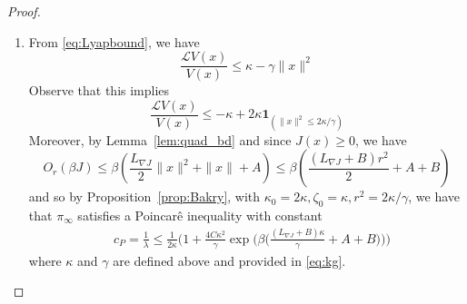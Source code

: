 \documentclass[journal,onecolumn]{IEEEtran}
\newcommand{\grad}{\nabla}
\newcommand{\rew}{J}
\newcommand{\dimn}{N}
\newcommand{\gibbs}{\ids_{\infty}}
\newcommand{\pconst}{c_P}
\newcommand{\bc}{\kappa_0}
\newcommand{\bcc}{\zeta_0}
\newcommand{\bccc}{r}
\newcommand{\gen}{\mathcal{L}}
\newcommand{\ind}{\boldsymbol{1}}
\newcommand{\ids}{\pi}
\newcommand{\idistmax}{\bar{\ids}_0}
\newcommand{\idw}{\gamma}
\newcommand{\isp}{0,\idw}
\newcommand{\idistmaxw}{\bar{\ids}_{\isp}}
\newcommand{\tailbound}{M}
\newcommand{\constA}{A}
\newcommand{\constB}{B}
\newcommand{\idiffc}{I}
\newcommand{\dissm}{m}
\newcommand{\dissb}{b}
\newcommand{\larg}{x}
\newcommand{\lipGJ}{L_{\grad\rew}}
\begin{document}
{\begin{proof}
\begin{enumerate}
\begin{align*}
                &\quad - (\idistmaxw^2 + 1)\left(\frac{1}{2}\frac{(\beta\dissm)^2}{\idistmaxw^2+1}\left(1 - \frac{1}{\idistmaxw^2+1}\right) \right)\|\larg\|^2\biggr\} \\
                &\leq \biggl(\frac{1}{2} \beta\dissm \dimn  + \beta \dissm \idiffc \biggr) + \frac{1}{2}\biggl[ \beta^2\dissm \dissb  + \left(\beta\dissm\tailbound\right)^2 \biggr]\\
                &\quad - \frac{1}{2}\left((\beta\dissm)^2 + \left( 1-\frac{1}{\idistmax^2+1}\right)\right)\|\larg\|^2
        \end{align*}


        \begin{align*}
             := \kappa - \gamma\|\larg\|^2\\
        \end{align*}
        and observe that $\kappa, \gamma >0$. Thus, condition (1) of Proposition~\ref{prop:cat} holds. 

        \item From \eqref{eq:Lyapbound}, we have 
        \[\frac{\gen V(\larg)}{V(\larg)} \leq \kappa - \gamma\|\larg\|^2\]
        Observe that this implies 
        \[\frac{\gen V(\larg)}{V(\larg)} \leq -\kappa + 2\kappa\ind_{(\|\larg\|^2 \leq 2\kappa / \gamma)}\]
    Moreover, by Lemma~\ref{lem:quad_bd} and since $\rew(\larg) \geq 0$, we have 
    \[O_{\bccc}(\beta \rew) \leq \beta\left(\frac{\lipGJ}{2}\|\larg\|^2 + \|\larg\| + \constA \right) \leq \beta\left(\frac{(\lipGJ+\constB)\bccc^2}{2} + \constA + \constB\right) \]
    and so by Proposition~\ref{prop:Bakry}, with $\bc = 2\kappa, \bcc = \kappa, \bccc^2 = 2\kappa / \gamma$, we have that $\gibbs$ satisfies a Poincar\^e inequality with constant
    \begin{align*}
            &\pconst = \frac{1}{\lambda} \leq  \frac{1}{2\kappa} \biggl(1 + \frac{4C\kappa^2}{\gamma}\exp\biggl(\beta\biggl(\frac{(\lipGJ+\constB)\kappa}{\gamma} + \constA + \constB\biggr)\biggr) \biggr)
    \end{align*} 
    where $\kappa$ and $\gamma$ are defined above and provided in \eqref{eq:kg}.
    

\end{enumerate}
\end{proof}}
\end{document}
